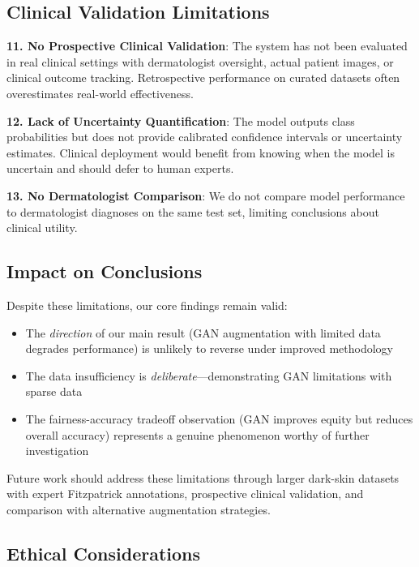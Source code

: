 \documentclass[10pt, twocolumn, letterpaper]{article}
\begin{document}
\subsection{Clinical Validation Limitations}

\textbf{11. No Prospective Clinical Validation}: The system has not been evaluated in real clinical settings with dermatologist oversight, actual patient images, or clinical outcome tracking. Retrospective performance on curated datasets often overestimates real-world effectiveness.

\textbf{12. Lack of Uncertainty Quantification}: The model outputs class probabilities but does not provide calibrated confidence intervals or uncertainty estimates. Clinical deployment would benefit from knowing when the model is uncertain and should defer to human experts.

\textbf{13. No Dermatologist Comparison}: We do not compare model performance to dermatologist diagnoses on the same test set, limiting conclusions about clinical utility.

\subsection{Impact on Conclusions}

Despite these limitations, our core findings remain valid:
\begin{itemize}[leftmargin=*, itemsep=2pt]
    \item The \textit{direction} of our main result (GAN augmentation with limited data degrades performance) is unlikely to reverse under improved methodology
    \item The data insufficiency is \textit{deliberate}—demonstrating GAN limitations with sparse data
    \item The fairness-accuracy tradeoff observation (GAN improves equity but reduces overall accuracy) represents a genuine phenomenon worthy of further investigation
\end{itemize}

Future work should address these limitations through larger dark-skin datasets with expert Fitzpatrick annotations, prospective clinical validation, and comparison with alternative augmentation strategies.

\subsection{Ethical Considerations}
\end{document}
